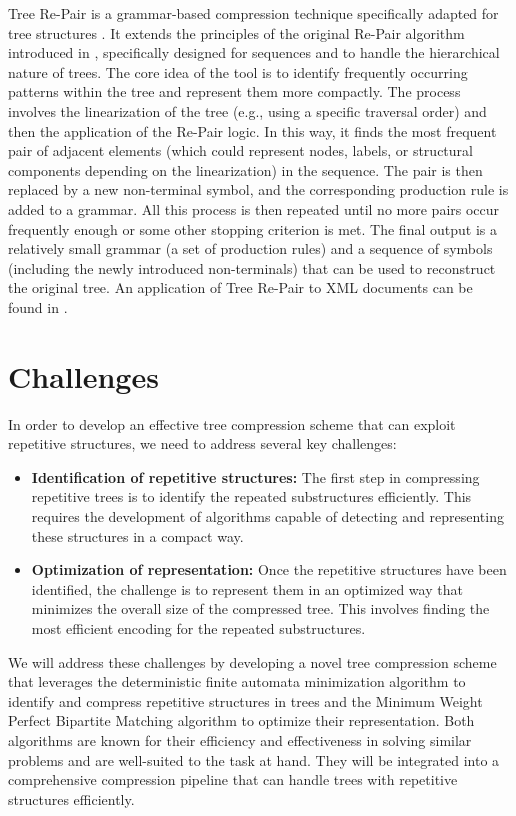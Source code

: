 Tree Re-Pair is a grammar-based compression technique specifically adapted for tree structures \cite{lohrey2011tree}. It extends the principles of the original Re-Pair algorithm introduced in \cite{larsson2000off}, specifically designed for sequences and to handle the hierarchical nature of trees. The core idea of the tool is to identify frequently occurring patterns within the tree and represent them more compactly.
The process involves the linearization of the tree (e.g., using a specific traversal order) and then the application of the Re-Pair logic. In this way, it finds the most frequent pair of adjacent elements (which could represent nodes, labels, or structural components depending on the linearization) in the sequence. The pair is then replaced by a new non-terminal symbol, and the corresponding production rule is added to a grammar. All this process is then repeated until no more pairs occur frequently enough or some other stopping criterion is met. The final output is a relatively small grammar (a set of production rules) and a sequence of symbols (including the newly introduced non-terminals) that can be used to reconstruct the original tree. An application of Tree Re-Pair to XML documents can be found in \cite{lohrey2013xml}.

\section{Challenges}
In order to develop an effective tree compression scheme that can exploit repetitive structures, we need to address several key challenges:
\begin{itemize}
    \item \textbf{Identification of repetitive structures:} The first step in compressing repetitive trees is to identify the repeated substructures efficiently. This requires the development of algorithms capable of detecting and representing these structures in a compact way.
    \item \textbf{Optimization of representation:} Once the repetitive structures have been identified, the challenge is to represent them in an optimized way that minimizes the overall size of the compressed tree. This involves finding the most efficient encoding for the repeated substructures.
\end{itemize}

We will address these challenges by developing a novel tree compression scheme that leverages the deterministic finite automata minimization algorithm to identify and compress repetitive structures in trees and the Minimum Weight Perfect Bipartite Matching algorithm to optimize their representation. Both algorithms are known for their efficiency and effectiveness in solving similar problems and are well-suited to the task at hand. They will be integrated into a comprehensive compression pipeline that can handle trees with repetitive structures efficiently.


